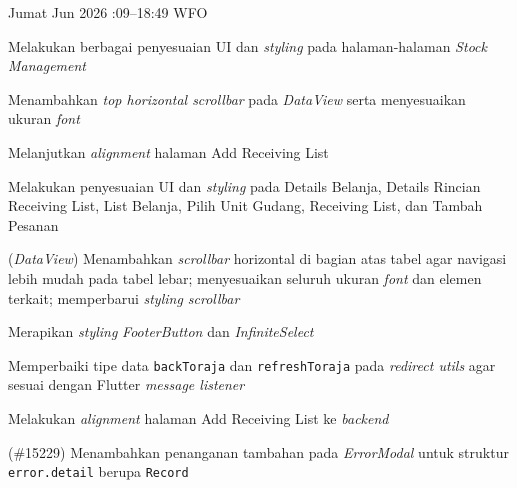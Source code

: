\begin{logtable}
    {
        Jumat  Jun 2026 :09--18:49 \linebreak %
        WFO
    }{
        \begin{loglist}
            \item Melakukan berbagai penyesuaian UI dan \textit{styling} pada halaman-halaman
            \textit{Stock Management}
            \item Menambahkan \textit{top horizontal scrollbar} pada \textit{DataView} serta
            menyesuaikan ukuran \textit{font}
            \item Melanjutkan \textit{alignment} halaman Add Receiving List
        \end{loglist}
    }{
        \begin{logwork}
            \item Melakukan penyesuaian UI dan \textit{styling} pada Details Belanja, Details
            Rincian Receiving List, List Belanja, Pilih Unit Gudang, Receiving List, dan
            Tambah Pesanan
            \item (\textit{DataView}) Menambahkan \textit{scrollbar} horizontal di bagian atas tabel agar navigasi lebih mudah pada tabel lebar; menyesuaikan seluruh ukuran \textit{font} dan elemen terkait; memperbarui \textit{styling scrollbar}
            \item Merapikan \textit{styling} \textit{FooterButton} dan \textit{InfiniteSelect}
            \item Memperbaiki tipe data \texttt{backToraja} dan \texttt{refreshToraja} pada
            \textit{redirect utils} agar sesuai dengan Flutter \textit{message listener}
            \item Melakukan \textit{alignment} halaman Add Receiving List ke \textit{backend}
            \item (\#15229) Menambahkan penanganan tambahan pada \textit{ErrorModal} untuk struktur \texttt{error.detail} berupa \texttt{Record}
        \end{logwork}
    }



\end{logtable}
